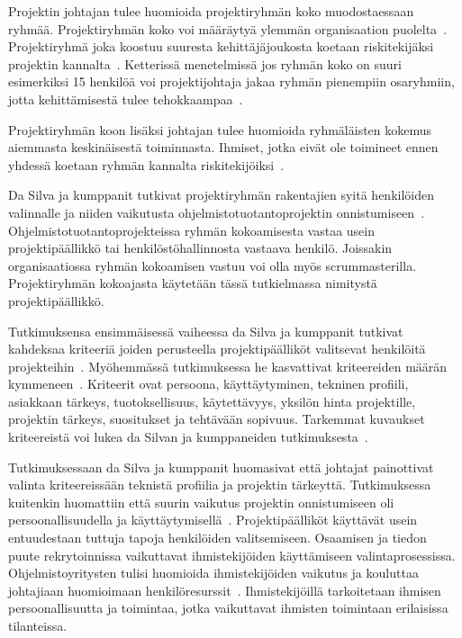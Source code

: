 \documentclass[finnish]{tktltiki2}
\theoremstyle{definition}
\theoremstyle{remark}
\begin{document}
Projektin johtajan tulee huomioida projektiryhmän koko muodostaessaan ryhmää. Projektiryhmän koko voi määräytyä ylemmän organisaation puolelta~\cite{McLeod:2011:FAS:1978802.1978803}. Projektiryhmä joka koostuu suuresta kehittäjäjoukosta koetaan riskitekijäksi projektin kannalta~\cite{McLeod:2011:FAS:1978802.1978803}. Ketterissä menetelmissä jos ryhmän koko on suuri esimerkiksi 15 henkilöä voi projektijohtaja jakaa ryhmän pienempiin osaryhmiin, jotta kehittämisestä tulee tehokkaampaa~\cite{Augustine:2005:APM:1101779.1101781}.

Projektiryhmän koon lisäksi johtajan tulee huomioida ryhmäläisten kokemus aiemmasta keskinäisestä toiminnasta. Ihmiset, jotka eivät ole toimineet ennen yhdessä koetaan ryhmän kannalta riskitekijöiksi~\cite{McLeod:2011:FAS:1978802.1978803}. 

Da Silva ja kumppanit tutkivat projektiryhmän rakentajien syitä henkilöiden valinnalle ja niiden vaikutusta ohjelmistotuotantoprojektin onnistumiseen~\cite{daSilva2012, francca2009quantitative}. Ohjelmistotuotantoprojekteissa ryhmän kokoamisesta vastaa usein projektipäällikkö tai henkilöstöhallinnosta vastaava henkilö. Joissakin organisaatiossa ryhmän kokoamisen vastuu voi olla myös scrummasterilla. Projektiryhmän kokoajasta käytetään tässä tutkielmassa nimitystä projektipäällikkö.

Tutkimuksensa ensimmäisessä vaiheessa da Silva ja kumppanit tutkivat kahdeksaa kriteeriä joiden perusteella projektipäälliköt valitsevat henkilöitä projekteihin~\cite{francca2009quantitative}. Myöhemmässä tutkimuksessa he kasvattivat kriteereiden määrän kymmeneen~\cite{daSilva2012}. Kriteerit ovat persoona, käyttäytyminen, tekninen profiili, asiakkaan tärkeys, tuotoksellisuus, käytettävyys, yksilön hinta projektille, projektin tärkeys, suositukset ja tehtävään sopivuus. Tarkemmat kuvaukset kriteereistä voi lukea da Silvan ja kumppaneiden tutkimuksesta~\cite{daSilva2012}.

Tutkimuksessaan da Silva ja kumppanit huomasivat että johtajat painottivat valinta kriteereissään teknistä profiilia ja projektin tärkeyttä. Tutkimuksessa kuitenkin huomattiin että suurin vaikutus projektin onnistumiseen oli persoonallisuudella ja käyttäytymisellä~\cite{daSilva2012}. Projektipäälliköt käyttävät usein entuudestaan tuttuja tapoja henkilöiden valitsemiseen. Osaamisen ja tiedon puute rekrytoinnissa vaikuttavat ihmistekijöiden käyttämiseen valintaprosessissa. Ohjelmistoyritysten tulisi huomioida ihmistekijöiden vaikutus ja kouluttaa johtajiaan huomioimaan henkilöresurssit~\cite{daSilva2012}. Ihmistekijöillä tarkoitetaan ihmisen persoonallisuutta ja toimintaa, jotka vaikuttavat ihmisten toimintaan erilaisissa tilanteissa.
\end{document}
